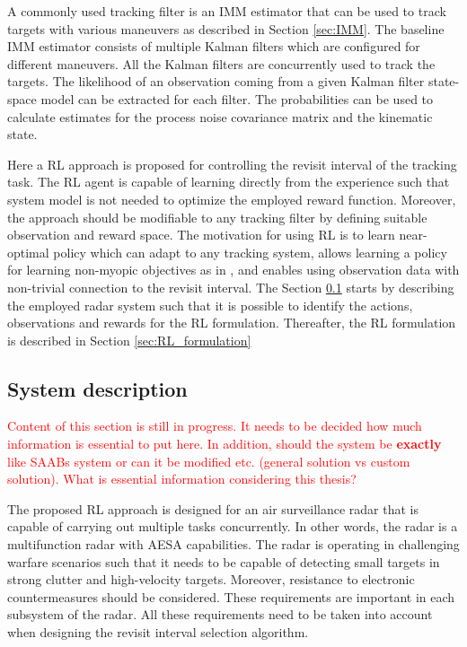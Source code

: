 \documentclass[english, 12pt, a4paper, elec, utf8, a-1b, online]{aaltothesis}
\begin{document}
A commonly used tracking filter is an IMM estimator that can be used to track targets with various maneuvers as described in Section \ref{sec:IMM}.
The baseline IMM estimator consists of multiple Kalman filters which are configured for different maneuvers.
All the Kalman filters are concurrently used to track the targets.
The likelihood of an observation coming from a given Kalman filter state-space model can be extracted for each filter.
The probabilities can be used to calculate estimates for the process noise covariance matrix and the kinematic state.

Here a RL approach is proposed for controlling the revisit interval of the tracking task.
The RL agent is capable of learning directly from the experience such that 
system model is not needed to optimize the employed reward function.
Moreover, the approach should be modifiable to any tracking filter by defining suitable observation and reward space.
The motivation for using RL is to learn near-optimal policy which can adapt to any tracking system, allows learning a policy for learning non-myopic objectives as in \cite{Charlish2015}, and enables using observation data with non-trivial connection to the revisit interval.
The Section \ref{seq:system_description} starts by describing the employed radar system such that it is possible to identify the actions, observations and rewards for the RL formulation.
Thereafter, the RL formulation is described in Section \ref{sec:RL_formulation} 


\subsection{System description} \label{seq:system_description}

\textcolor{red}{Content of this section is still in progress. It needs to be decided how much information is essential to put here. In addition, should the system be \textbf{exactly} like SAABs system or can it be modified etc. (general solution vs custom solution). What is essential information considering this thesis?}

The proposed RL approach is designed for an air surveillance radar that is capable of carrying out multiple tasks concurrently.
In other words, the radar is a multifunction radar with AESA capabilities.
The radar is operating in challenging warfare scenarios such that it needs to be capable of detecting small targets in strong clutter and high-velocity targets.
Moreover, resistance to electronic countermeasures should be considered. 
These requirements are important in each subsystem of the radar. 
All these requirements need to be taken into account when designing the revisit interval selection algorithm.
\end{document}
